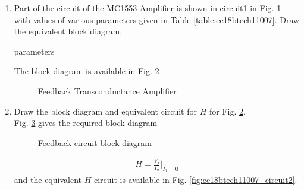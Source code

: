 \begin{enumerate}[label=\thesection.\arabic*.,ref=\thesection.\theenumi]

 \item Part of the circuit of the MC1553 Amplifier is shown in circuit1 in  Fig. \ref{fig:ee18btech11007_circuit1} with values of various parameters given in  Table \ref{table:ee18btech11007}.  Draw the equivalent block diagram.

\renewcommand{\thefigure}{\theenumi.\arabic{figure}}
 \begin{figure}[!ht]
	\begin{center}
		
		\resizebox{\columnwidth}{!}{}
	\end{center}
\caption{}
\label{fig:ee18btech11007_circuit1}
\end{figure}
 
\begin{table}[!ht]
\centering

\caption{parameters}
\label{table:ee18btech11007}
\end{table}
\solution  The block diagram is available in Fig. \ref{fig:ee18btech11007_trans-conductance_blockdiagram} \begin{figure}[!ht]
	\begin{center}
		
		\resizebox{\columnwidth}{!}{}
	\end{center}
\caption{Feedback Transconductance Amplifier}
\label{fig:ee18btech11007_trans-conductance_blockdiagram}
\end{figure}
\renewcommand{\thefigure}{\theenumi}

\item Draw the block diagram and equivalent circuit for $H$ for Fig. \ref{fig:ee18btech11007_trans-conductance_blockdiagram}.
\\
\solution Fig. \ref{fig:ee18btech11007_H_blockdiagram} gives the required block diagram
\renewcommand{\thefigure}{\theenumi.\arabic{figure}}
\begin{figure}[!ht]
	\begin{center}
		
		\resizebox{\columnwidth}{!}{}
	\end{center}
\caption{Feedback circuit block diagram}
\label{fig:ee18btech11007_H_blockdiagram}
\end{figure}
\begin{align}
    H=\frac{V_f}{I_o}|_{I_{1}=0} 
\end{align}
%
and the equivalent $H$ circuit is available in Fig. \ref{fig:ee18btech11007_circuit2}.


\end{enumerate}
